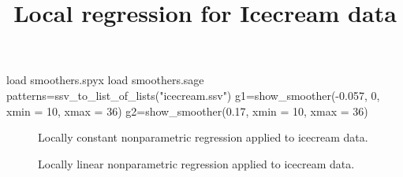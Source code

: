 \documentclass[11pt, reqno]{amsart}
\begin{document}
\title{Local regression for Icecream data} 
\maketitle


\begin{sagesilent}
load smoothers.spyx
load smoothers.sage
patterns=ssv_to_list_of_lists("icecream.ssv")
g1=show_smoother(-0.057, 0, xmin = 10, xmax = 36)
g2=show_smoother(0.17, xmin = 10, xmax = 36)
\end{sagesilent}

\begin{figure}[h]
  \centering 
  \caption{Locally constant nonparametric regression applied to
    icecream data.}
\end{figure}

\begin{figure}[h]
  \centering 
  \caption{Locally linear nonparametric regression applied to icecream
    data.}
\end{figure}
\end{document}
